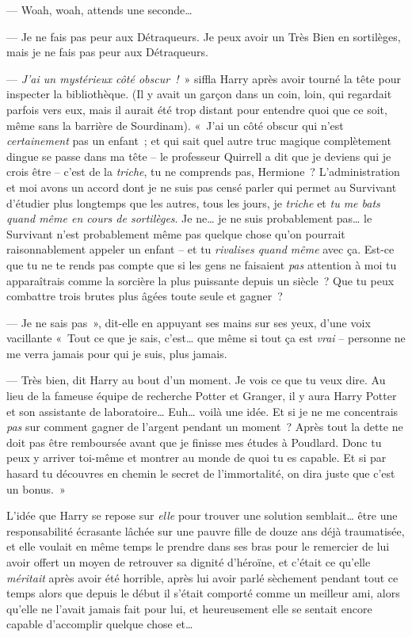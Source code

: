 --- Woah, woah, attends une seconde…

--- Je ne fais pas peur aux Détraqueurs. Je peux avoir un Très Bien en sortilèges, mais je ne fais pas peur aux Détraqueurs.

--- \emph{J'ai un mystérieux côté obscur~!}~» siffla Harry après avoir tourné la tête pour inspecter la bibliothèque. (Il y avait un garçon dans un coin, loin, qui regardait parfois vers eux, mais il aurait été trop distant pour entendre quoi que ce soit, même sans la barrière de Sourdinam). «~J'ai un côté obscur qui n'est \emph{certainement} pas un enfant~; et qui sait quel autre truc magique complètement dingue se passe dans ma tête -- le professeur Quirrell a dit que je deviens qui je crois être -- c'est de la \emph{triche}, tu ne comprends pas, Hermione~? L'administration et moi avons un accord dont je ne suis pas censé parler qui permet au Survivant d'étudier plus longtemps que les autres, tous les jours, je \emph{triche} et \emph{tu me bats quand même en cours de sortilèges}. Je ne… je ne suis probablement pas… le Survivant n'est probablement même pas quelque chose qu'on pourrait raisonnablement appeler un enfant -- et tu \emph{rivalises quand même} avec ça. Est-ce que tu ne te rends pas compte que si les gens ne faisaient \emph{pas} attention à moi tu apparaîtrais comme la sorcière la plus puissante depuis un siècle~? Que tu peux combattre trois brutes plus âgées toute seule et gagner~?

--- Je ne sais pas~», dit-elle en appuyant ses mains sur ses yeux, d'une voix vacillante «~Tout ce que je sais, c'est… que même si tout ça est \emph{vrai} -- personne ne me verra jamais pour qui je suis, plus jamais.

--- Très bien, dit Harry au bout d'un moment. Je vois ce que tu veux dire. Au lieu de la fameuse équipe de recherche Potter et Granger, il y aura Harry Potter et son assistante de laboratoire… Euh… voilà une idée. Et si je ne me concentrais \emph{pas} sur comment gagner de l'argent pendant un moment~? Après tout la dette ne doit pas être remboursée avant que je finisse mes études à Poudlard. Donc tu peux y arriver toi-même et montrer au monde de quoi tu es capable. Et si par hasard tu découvres en chemin le secret de l'immortalité, on dira juste que c'est un bonus.~»

L'idée que Harry se repose sur \emph{elle} pour trouver une solution semblait… être une responsabilité écrasante lâchée sur une pauvre fille de douze ans déjà traumatisée, et elle voulait en même temps le prendre dans ses bras pour le remercier de lui avoir offert un moyen de retrouver sa dignité d'héroïne, et c'était ce qu'elle \emph{méritait} après avoir été horrible, après lui avoir parlé sèchement pendant tout ce temps alors que depuis le début il s'était comporté comme un meilleur ami, alors qu'elle ne l'avait jamais fait pour lui, et heureusement elle se sentait encore capable d'accomplir quelque chose et…

